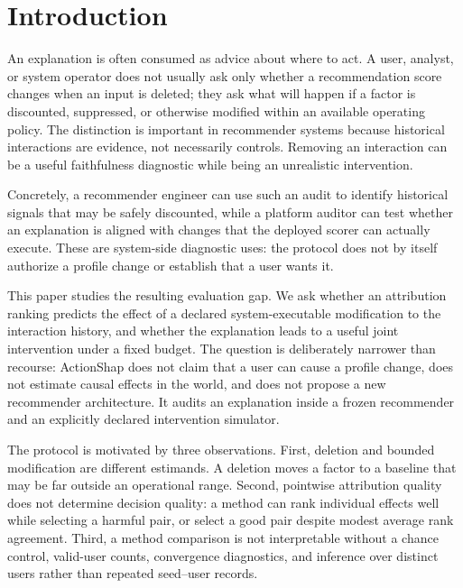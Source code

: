 \documentclass[a4paper,fleqn,doubleblind]{cas-sc}
\begin{document}
\maketitle
{}


\section{Introduction}
An explanation is often consumed as advice about where to act. A user, analyst, or system operator does not usually ask only whether a recommendation score changes when an input is deleted; they ask what will happen if a factor is discounted, suppressed, or otherwise modified within an available operating policy. The distinction is important in recommender systems because historical interactions are evidence, not necessarily controls. Removing an interaction can be a useful faithfulness diagnostic while being an unrealistic intervention.

Concretely, a recommender engineer can use such an audit to identify historical signals that may be safely discounted, while a platform auditor can test whether an explanation is aligned with changes that the deployed scorer can actually execute. These are system-side diagnostic uses: the protocol does not by itself authorize a profile change or establish that a user wants it.

This paper studies the resulting evaluation gap. We ask whether an attribution ranking predicts the effect of a declared system-executable modification to the interaction history, and whether the explanation leads to a useful joint intervention under a fixed budget. The question is deliberately narrower than recourse: ActionShap does not claim that a user can cause a profile change, does not estimate causal effects in the world, and does not propose a new recommender architecture. It audits an explanation inside a frozen recommender and an explicitly declared intervention simulator.

The protocol is motivated by three observations. First, deletion and bounded modification are different estimands. A deletion moves a factor to a baseline that may be far outside an operational range. Second, pointwise attribution quality does not determine decision quality: a method can rank individual effects well while selecting a harmful pair, or select a good pair despite modest average rank agreement. Third, a method comparison is not interpretable without a chance control, valid-user counts, convergence diagnostics, and inference over distinct users rather than repeated seed--user records.
\end{document}
